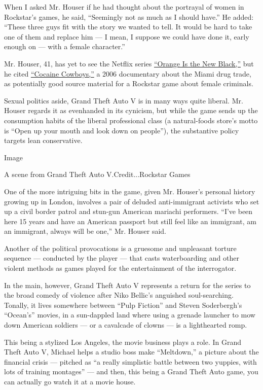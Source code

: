 When I asked Mr. Houser if he had thought about the portrayal of women
in Rockstar's games, he said, ``Seemingly not as much as I should
have.'' He added: ``These three guys fit with the story we wanted to
tell. It would be hard to take one of them and replace him --- I mean, I
suppose we could have done it, early enough on --- with a female
character.''

Mr. Houser, 41, has yet to see the Netflix series
\href{http://tv.nytimes3xbfgragh.onion/2013/07/11/arts/television/orange-is-the-new-black-a-nexflix-series.html}{``Orange
Is the New Black,''} but he cited
\href{http://movies.nytimes3xbfgragh.onion/2006/10/27/movies/27cowb.html}{``Cocaine
Cowboys,''} a 2006 documentary about the Miami drug trade, as
potentially good source material for a Rockstar game about female
criminals.

Sexual politics aside, Grand Theft Auto V is in many ways quite liberal.
Mr. Houser regards it as evenhanded in its cynicism, but while the game
sends up the consumption habits of the liberal professional class (a
natural-foods store's motto is ``Open up your mouth and look down on
people''), the substantive policy targets lean conservative.

Image

A scene from Grand Theft Auto V.Credit...Rockstar Games

One of the more intriguing bits in the game, given Mr. Houser's personal
history growing up in London, involves a pair of deluded anti-immigrant
activists who set up a civil border patrol and stun-gun American
mariachi performers. ``I've been here 15 years and have an American
passport but still feel like an immigrant, am an immigrant, always will
be one,'' Mr. Houser said.

Another of the political provocations is a gruesome and unpleasant
torture sequence --- conducted by the player --- that casts
waterboarding and other violent methods as games played for the
entertainment of the interrogator.

In the main, however, Grand Theft Auto V represents a return for the
series to the broad comedy of violence after Niko Bellic's anguished
soul-searching. Tonally, it lives somewhere between ``Pulp Fiction'' and
Steven Soderbergh's ``Ocean's'' movies, in a sun-dappled land where
using a grenade launcher to mow down American soldiers --- or a
cavalcade of clowns --- is a lighthearted romp.

This being a stylized Los Angeles, the movie business plays a role. In
Grand Theft Auto V, Michael helps a studio boss make ``Meltdown,'' a
picture about the financial crisis --- pitched as ``a really simplistic
battle between two yuppies, with lots of training montages'' --- and
then, this being a Grand Theft Auto game, you can actually go watch it
at a movie house.

